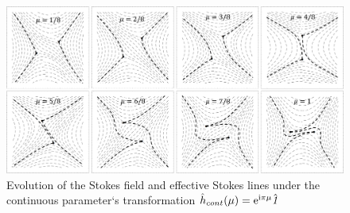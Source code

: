 \documentclass[12pt]{iopart}
\def\h{\hat{h}}
\def\unity{\hat{\it 1}}
\begin{document}
\begin{figure}
\centering
\noindent
\includegraphics[scale=.5]{stuff/wrs.png}
\caption{Evolution of the Stokes field and effective Stokes lines 
under the continuous parameter`s transformation $\h_{cont}(\mu)=\rme^{\rmi\pi\mu}\unity$}
\label{fig:webrs}
\end{figure} 
\end{document}
